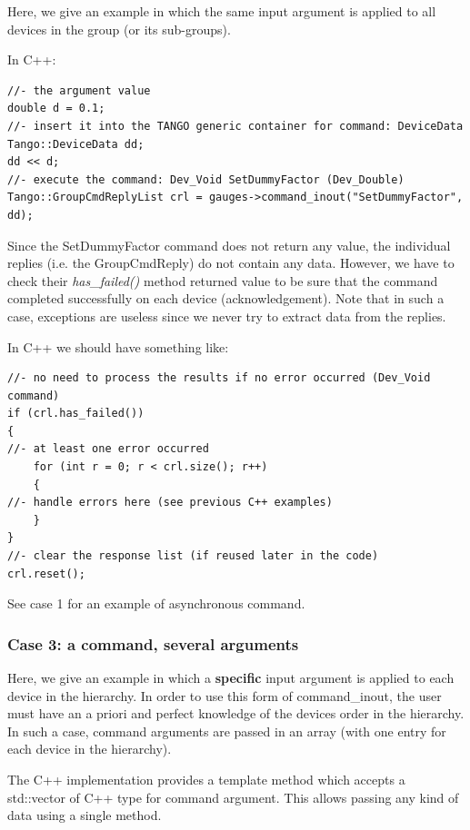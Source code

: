 Here, we give an example in which the same input argument is applied
to all devices in the group (or its sub-groups). 

In C++:


\begin{verbatim}
//- the argument value
double d = 0.1;
//- insert it into the TANGO generic container for command: DeviceData
Tango::DeviceData dd;
dd << d;
//- execute the command: Dev_Void SetDummyFactor (Dev_Double)
Tango::GroupCmdReplyList crl = gauges->command_inout("SetDummyFactor", dd);
\end{verbatim}


Since the SetDummyFactor command does not return any value, the individual
replies (i.e. the GroupCmdReply) do not contain any data. However,
we have to check their \emph{has\_failed()} method
returned value to be sure that the command completed successfully
on each device (acknowledgement). Note that in such a case, exceptions
are useless since we never try to extract data from the replies. 

In C++ we should have something like: 


\begin{verbatim}
//- no need to process the results if no error occurred (Dev_Void command)
if (crl.has_failed())
{
//- at least one error occurred
    for (int r = 0; r < crl.size(); r++)
    {
//- handle errors here (see previous C++ examples)
    }
}
//- clear the response list (if reused later in the code)
crl.reset();
\end{verbatim}


See case 1 for an example of asynchronous command.


\subsubsection{Case 3: a command, several arguments}
\label{sub:Case-3}

Here, we give an example in which a \textbf{specific} input argument
is applied to each device in the hierarchy. In order to use this form
of command\_inout, the user must have an \textquotedbl{}a
priori\textquotedbl{} and \textquotedbl{}perfect\textquotedbl{} knowledge
of the devices order in the hierarchy. In such a case, command arguments
are passed in an \textquotedbl{}array\textquotedbl{} (with one entry
for each device in the hierarchy).

The C++ implementation provides a template method which accepts a
std::vector of \textquotedbl{}C++ type for command argument\textquotedbl{}.
This allows passing any kind of data using a single method.

